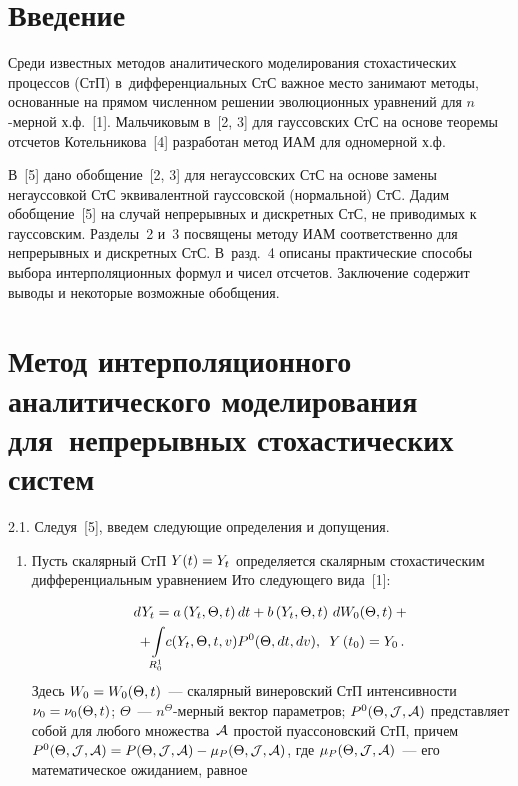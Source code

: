 \begin{multicols}{2}

\label{st\stat}

\section{Введение}

Среди известных методов аналитического моделирования стохастических процессов 
(СтП) в~дифференциальных СтС
важное место занимают методы, основанные на прямом численном решении эволюционных 
уравнений для $n$-мер\-ной х.ф.~[1]. Мальчиковым в~[2, 3] для гауссовских СтС 
на основе теоремы отсчетов Котельникова~[4] разработан метод ИАМ для одномерной х.ф.

В~[5] дано обобщение~[2, 3] для негауссовских СтС на основе замены негауссовкой 
СтС эквивалентной гауссовской (нормальной) СтС. Дадим обобщение~[5] 
на случай непрерывных и дискретных СтС, не приводимых к гауссовским. Разделы~2 и~3 
посвящены методу ИАМ соответственно для непрерывных и дискретных СтС. 
В~разд.~4 описаны практические способы выбора интерполяционных формул и чисел отсчетов. 
Заключение содержит выводы и некоторые возможные обобщения.

\vspace*{-12pt}

\section{Метод интерполяционного 
аналитического моделирования для~непрерывных стохастических систем}

\vspace*{-3pt}

2.1. Следуя~[5], введем следующие определения и допущения.

\columnbreak

\noindent
\begin{enumerate}[1.]
\item Пусть скалярный СтП  $Y(t) \hm= Y_t$ определяется скалярным 
стохастическим дифференциальным уравнением Ито следующего вида~[1]:

\noindent
\begin{multline}
dY_t = a \left(Y_t, \Theta, t\right) dt + b \left(Y_t, \Theta, t\right)\, 
d W_0 (\Theta, t)+ {}\\
\!{}+\!
    \int\limits_{R_0^1}\! c(Y_t, \Theta, t, v) P^0 (\Theta, dt, dv),\enskip  
    Y\left(t_0\right)=Y_0\,.\label{e2.1-s}
    \end{multline}
Здесь $W_0 \hm= W_0 (\Theta, t)$~--- скалярный винеровский СтП интенсивности 
$\nu_0\hm=\nu_0 (\Theta, t)$; $\Theta$~--- $n^\Theta$-мер\-ный 
вектор параметров; $P^0(\Theta, {\cal J}, {\cal A})$  пред\-став\-ля\-ет собой 
для любого множества~${\cal A}$ простой пуассоновский СтП, 
причем $P^0 (\Theta, {\cal J},{\cal A})\hm= P(\Theta, {\cal J},{\cal A})
\hm- \mu_P (\Theta, {\cal J},{\cal A})$, где 
$\mu_P (\Theta, {\cal J},{\cal A})$~--- его математическое ожиданием, равное


\end{enumerate}
\end{multicols}
